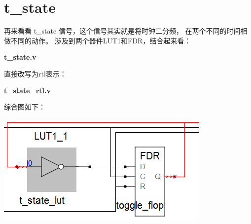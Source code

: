 \section{t\_state}

再来看看 t\_state 信号，这个信号其实就是将时钟二分频，
在两个不同的时间相做不同的动作。 
涉及到两个器件LUT1和FDR，结合起来看：

\textbf{t\_state.v}


直接改写为rtl表示：

\textbf{t\_state\_rtl.v}


综合图如下：

\includegraphics{t_state.png}



